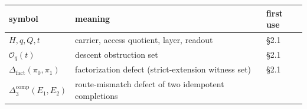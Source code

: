 \begin{longtable}[]{@{}lll@{}}
\toprule
\begin{minipage}[b]{0.27\columnwidth}\raggedright
symbol\strut
\end{minipage} & \begin{minipage}[b]{0.49\columnwidth}\raggedright
meaning\strut
\end{minipage} & \begin{minipage}[b]{0.17\columnwidth}\raggedright
first use\strut
\end{minipage}\tabularnewline
\midrule
\endhead
\begin{minipage}[t]{0.27\columnwidth}\raggedright
\(H, q, Q, t\)\strut
\end{minipage} & \begin{minipage}[t]{0.49\columnwidth}\raggedright
carrier, access quotient, layer, readout\strut
\end{minipage} & \begin{minipage}[t]{0.17\columnwidth}\raggedright
§2.1\strut
\end{minipage}\tabularnewline
\begin{minipage}[t]{0.27\columnwidth}\raggedright
\(\mathcal O_q(t)\)\strut
\end{minipage} & \begin{minipage}[t]{0.49\columnwidth}\raggedright
descent obstruction set\strut
\end{minipage} & \begin{minipage}[t]{0.17\columnwidth}\raggedright
§2.1\strut
\end{minipage}\tabularnewline
\begin{minipage}[t]{0.27\columnwidth}\raggedright
\(\Delta_{\mathrm{fact}}(\pi_0,\pi_1)\)\strut
\end{minipage} & \begin{minipage}[t]{0.49\columnwidth}\raggedright
factorization defect (strict-extension witness set)\strut
\end{minipage} & \begin{minipage}[t]{0.17\columnwidth}\raggedright
§2.1\strut
\end{minipage}\tabularnewline
\begin{minipage}[t]{0.27\columnwidth}\raggedright
\(\Delta_3^{\mathrm{comp}}(E_1,E_2)\)\strut
\end{minipage} & \begin{minipage}[t]{0.49\columnwidth}\raggedright
route-mismatch defect of two idempotent completions\strut
\end{minipage} & \begin{minipage}[t]{0.17\columnwidth}\raggedright

\end{minipage}
\end{longtable}
